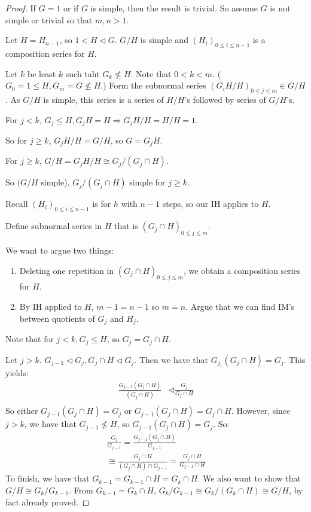 \documentclass{report}
\begin{document}
\begin{proof}
    If $G = 1$ or if $G$ is simple, then the result is trivial. So assume $G$ is not simple or trivial so that $m, n > 1$.

    Let $H = H_{n-1}$, so $1 < H \lhd G$. $G/H$ is simple and $(H_i)_{0 \leq i \leq n-1}$ is a composition series for $H$.

    Let $k$ be least $k$ such taht $G_k \not\leq H$. Note that $0 < k < m$. ($G_0 = 1 \leq H, G_m = G \not\leq H$.) Form the subnormal series $(G_iH/H)_{0 \leq j \leq m} \in G/H$. As $G/H$ is simple, this series is a series of $H/H$'s followed by series of $G/H$'s. 

    For $j<k$, $G_j \leq H, G_jH = H \Rightarrow G_jH/H = H/H = 1$.

    So for $j \geq k$, $G_j H/H = G/H$, so $G = G_jH$. 

    For $j \geq k$, $G/H = G_jH/H \cong G_j/(G_j \cap H)$.

    So $(G/H$ simple), $G_j / (G_j \cap H)$ simple for $j \geq k$. 

    Recall $(H_i)_{0 \leq i \leq n-1}$ is for $h$ with $n-1$ steps, so our IH applies to $H$. 

    Define subnormal series in $H$ that is $(G_j \cap H)_{0 \leq j \leq m}$.

    We want to argue two things:
    \begin{enumerate}[label=(\alph*)]
        \item Deleting one repetition in $(G_j \cap H)_{0 \leq j \leq m}$, we obtain a composition series for $H$.
        \item By IH applied to $H$, $m-1 = n-1$ so $m=n$. Argue that we can find IM's between quotients of $G_j$ and $H_j$.
    \end{enumerate}
    Note that for $j < k, G_j \leq H$, so $G_j = G_j \cap H$. 

    Let $j > k$. $G_{j-1} \lhd G_j, G_j \cap H \lhd G_j$. Then we have that $G_{j_1}(G_j \cap H) = G_{j}$. This yields:
    \begin{align*}
        \frac{G_{j-1}(G_j \cap H)}{(G_j \cap H)} &\lhd \frac{G_j}{G_j \cap H} \tag{this RHS is simple} \\
    \end{align*}
    So either $G_{j-1}(G_j \cap H) = G_j$ or $G_{j-1}(G_j \cap H) = G_j \cap H$. However, since $j >k$, we have that $G_{j-1} \not\leq H$, so $G_{j-1} (G_j \cap H) = G_j$. So:
    \begin{align*}
        \frac{G_j}{G_{j-1}} = \frac{G_{j-1}(G_j \cap H)}{G_{j-1}} \\
        \cong \frac{G_j \cap H}{(G_{j} \cap H)\cap G_{j-1}} = \frac{G_j \cap H}{G_{j-1} \cap H}
    \end{align*}
    To finish, we have that $G_{k-1} = G_{k-1} \cap H = G_k \cap H$. We also want to show that $G/H \cong G_k / G_{k-1}$. From $G_{k-1} = G_k \cap H$, $G_k / G_{k-1} \cong G_k / (G_k \cap H) \cong G/H$, by fact already proved. 


\end{proof}
\end{document}
